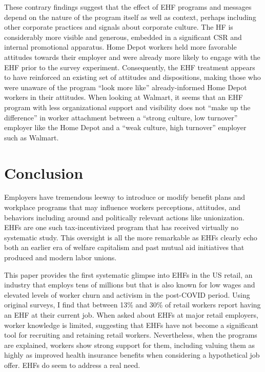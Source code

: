\documentclass[
  11pt,
  oneside]{article}
\begin{document}
These contrary findings suggest that the effect of EHF programs and messages depend on the nature of the program itself as well as context, perhaps including other corporate practices and signals about corporate culture. The HF is considerably more visible and generous, embedded in a significant CSR and internal promotional apparatus. Home Depot workers held more favorable attitudes towards their employer and were already more likely to engage with the EHF prior to the survey experiment. Consequently, the EHF treatment appears to have reinforced an existing set of attitudes and dispositions, making those who were unaware of the program ``look more like'' already-informed Home Depot workers in their attitudes. When looking at Walmart, it seems that an EHF program with less organizational support and visibility does not ``make up the difference'' in worker attachment between a ``strong culture, low turnover'' employer like the Home Depot and a ``weak culture, high turnover'' employer such as Walmart.

\section{Conclusion}\label{conclusion}

Employers have tremendous leeway to introduce or modify benefit plans and workplace programs that may influence workers perceptions, attitudes, and behaviors including around and politically relevant actions like unionization. EHFs are one such tax-incentivized program that has received virtually no systematic study. This oversight is all the more remarkable as EHFs clearly echo both an earlier era of welfare capitalism and past mutual aid initiatives that produced and modern labor unions.

This paper provides the first systematic glimpse into EHFs in the US retail, an industry that employs tens of millions but that is also known for low wages and elevated levels of worker churn and activism in the post-COVID period. Using original surveys, I find that between 13\% and 30\% of retail workers report having an EHF at their current job. When asked about EHFs at major retail employers, worker knowledge is limited, suggesting that EHFs have not become a significant tool for recruiting and retaining retail workers. Nevertheless, when the programs are explained, workers show strong support for them, including valuing them as highly as improved health insurance benefits when considering a hypothetical job offer. EHFs do seem to address a real need.
\end{document}
